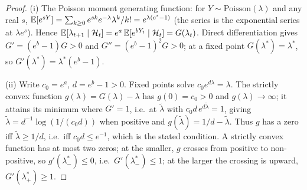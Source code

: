 \begin{proof}
(i) The Poisson moment generating function: for $Y \sim \mathrm{Poisson}(\lambda)$ and any real $s$,
$\mathbb{E}[e^{sY}] = \sum_{k \ge 0} e^{sk} e^{-\lambda}\lambda^k / k! = e^{\lambda(e^s - 1)}$ (the series
is the exponential series at $\lambda e^s$). Hence $\mathbb{E}[\lambda_{t+1} \mid \mathcal{H}_t] = e^a\,
\mathbb{E}[e^{bY_t} \mid \mathcal{H}_t] = G(\lambda_t)$. Direct differentiation gives $G' = (e^b - 1) G > 0$ and
$G'' = (e^b-1)^2 G > 0$; at a fixed point $G(\lambda^*) = \lambda^*$, so $G'(\lambda^*) =
\lambda^*(e^b - 1)$.

(ii) Write $c_0 = e^a$, $d = e^b - 1 > 0$. Fixed points solve $c_0 e^{d\lambda} = \lambda$. The
strictly convex function $g(\lambda) = G(\lambda) - \lambda$ has $g(0) = c_0 > 0$ and $g(\lambda)
\to \infty$; it attains its minimum where $G' = 1$, i.e.\ at $\tilde\lambda$ with $c_0 d\,
e^{d\tilde\lambda} = 1$, giving $\tilde\lambda = d^{-1}\log(1/(c_0 d))$ when positive and
$g(\tilde\lambda) = 1/d - \tilde\lambda$. Thus $g$ has a zero iff $\tilde\lambda \ge 1/d$, i.e.\ iff
$c_0 d \le e^{-1}$, which is the stated condition. A strictly convex function has at most two zeros;
at the smaller, $g$ crosses from positive to non-positive, so $g'(\lambda^*_-) \le 0$, i.e.\
$G'(\lambda^*_-) \le 1$; at the larger the crossing is upward, $G'(\lambda^*_+) \ge 1$.


\end{proof}
